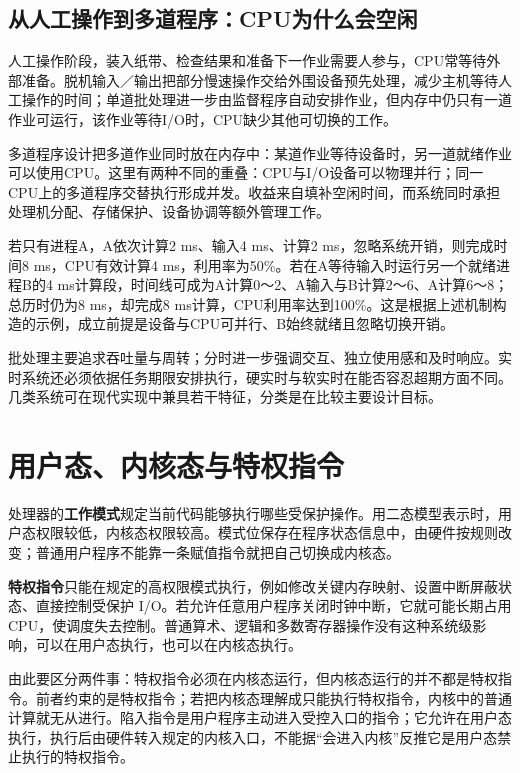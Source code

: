 \subsection{从人工操作到多道程序：CPU为什么会空闲}\label{OS01-batch-evolution}

人工操作阶段，装入纸带、检查结果和准备下一作业需要人参与，CPU常等待外部准备。脱机输入／输出把部分慢速操作交给外围设备预先处理，减少主机等待人工操作的时间；单道批处理进一步由监督程序自动安排作业，但内存中仍只有一道作业可运行，该作业等待I/O时，CPU缺少其他可切换的工作。

多道程序设计把多道作业同时放在内存中：某道作业等待设备时，另一道就绪作业可以使用CPU。这里有两种不同的重叠：CPU与I/O设备可以物理并行；同一CPU上的多道程序交替执行形成并发。收益来自填补空闲时间，而系统同时承担处理机分配、存储保护、设备协调等额外管理工作。

若只有进程A，A依次计算2 ms、输入4 ms、计算2 ms，忽略系统开销，则完成时间8 ms，CPU有效计算4 ms，利用率为50\%。若在A等待输入时运行另一个就绪进程B的4 ms计算段，时间线可成为A计算0～2、A输入与B计算2～6、A计算6～8；总历时仍为8 ms，却完成8 ms计算，CPU利用率达到100\%。这是根据上述机制构造的示例，成立前提是设备与CPU可并行、B始终就绪且忽略切换开销。

批处理主要追求吞吐量与周转；分时进一步强调交互、独立使用感和及时响应。实时系统还必须依据任务期限安排执行，硬实时与软实时在能否容忍超期方面不同。几类系统可在现代实现中兼具若干特征，分类是在比较主要设计目标。

\section{用户态、内核态与特权指令}\label{OS01-1-3}

处理器的\textbf{工作模式}规定当前代码能够执行哪些受保护操作。用二态模型表示时，用户态权限较低，内核态权限较高。模式位保存在程序状态信息中，由硬件按规则改变；普通用户程序不能靠一条赋值指令就把自己切换成内核态。

\textbf{特权指令}只能在规定的高权限模式执行，例如修改关键内存映射、设置中断屏蔽状态、直接控制受保护 I/O。若允许任意用户程序关闭时钟中断，它就可能长期占用 CPU，使调度失去控制。普通算术、逻辑和多数寄存器操作没有这种系统级影响，可以在用户态执行，也可以在内核态执行。

由此要区分两件事：特权指令必须在内核态运行，但内核态运行的并不都是特权指令。前者约束的是特权指令；若把内核态理解成只能执行特权指令，内核中的普通计算就无从进行。陷入指令是用户程序主动进入受控入口的指令；它允许在用户态执行，执行后由硬件转入规定的内核入口，不能据``会进入内核''反推它是用户态禁止执行的特权指令。


